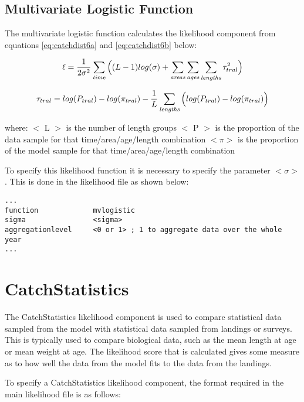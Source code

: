 \documentclass[10pt,twoside]{book}
\begin{document}
\subsection{Multivariate Logistic Function}
The multivariate logistic function calculates the likelihood component from equations \ref{eq:catchdist6a} and \ref{eq:catchdist6b} below:

\begin{equation}\label{eq:catchdist6a}
\ell = \frac{1}{2\sigma^2} \sum_{\it time} \Big((L - 1) log(\sigma)+\sum_{\it areas}\sum_{\it ages}\sum_{\it lengths} \tau_{tral}^2 \Big)
\end{equation}

\begin{equation}\label{eq:catchdist6b}
\tau_{tral} = log(P_{tral}) - log(\pi_{tral}) - \frac{1}{L}\sum_{\it lengths} \Big(log(P_{tral}) - log(\pi_{tral}) \Big)
\end{equation}

where:\newline
$<$ L $>$ is the number of length groups\newline
$<$ P $>$ is the proportion of the data sample for that time/area/age/length combination\newline
$<\pi>$ is the proportion of the model sample for that time/area/age/length combination

\bigskip
To specify this likelihood function it is necessary to specify the parameter $<\sigma>$. This is done in the likelihood file as shown below:

{\small\begin{verbatim}
...
function             mvlogistic
sigma                <sigma>
aggregationlevel     <0 or 1> ; 1 to aggregate data over the whole year
...
\end{verbatim}}

\section{CatchStatistics}\label{sec:catchstat}
The CatchStatistics likelihood component is used to compare statistical data sampled from the model with statistical data sampled from landings or surveys.  This is typically used to compare biological data, such as the mean length at age or mean weight at age.  The likelihood score that is calculated gives some measure as to how well the data from the model fits to the data from the landings.

\bigskip
To specify a CatchStatistics likelihood component, the format required in the main likelihood file is as follows:
\end{document}
